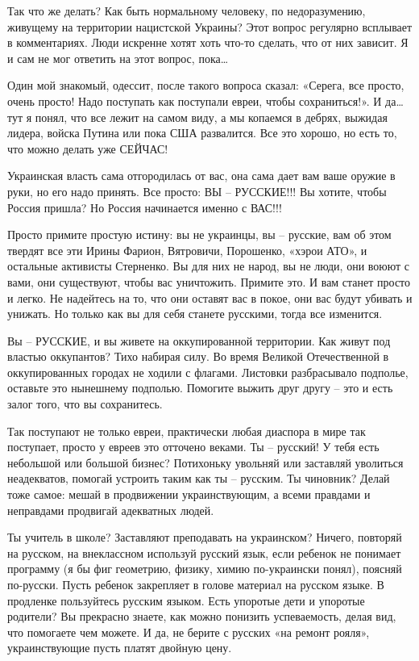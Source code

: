 Так что же делать? Как быть нормальному человеку, по недоразумению, живущему на
территории нацистской Украины? Этот вопрос регулярно всплывает в комментариях.
Люди искренне хотят хоть что-то сделать, что от них зависит. Я и сам не мог
ответить на этот вопрос, пока…

Один мой знакомый, одессит, после такого вопроса сказал: «Серега, все просто,
очень просто! Надо поступать как поступали евреи, чтобы сохраниться!». И да…
тут я понял, что все лежит на самом виду, а мы копаемся в дебрях, выжидая
лидера, войска Путина или пока США развалится. Все это хорошо, но есть то, что
можно делать уже СЕЙЧАС!

Украинская власть сама отгородилась от вас, она сама дает вам ваше оружие в
руки, но его надо принять. Все просто: ВЫ – РУССКИЕ!!! Вы хотите, чтобы Россия
пришла? Но Россия начинается именно с ВАС!!!

Просто примите простую истину: вы не украинцы, вы – русские, вам об этом
твердят все эти Ирины Фарион, Вятровичи, Порошенко, «хэрои АТО», и остальные
активисты Стерненко. Вы для них не народ, вы не люди, они воюют с вами, они
существуют, чтобы вас уничтожить. Примите это. И вам станет просто и легко. Не
надейтесь на то, что они оставят вас в покое, они вас будут убивать и унижать.
Но только как вы для себя станете русскими, тогда все изменится.

Вы – РУССКИЕ, и вы живете на оккупированной территории. Как живут под властью
оккупантов? Тихо набирая силу. Во время Великой Отечественной в оккупированных
городах не ходили с флагами. Листовки разбрасывало подполье, оставьте это
нынешнему подполью. Помогите выжить друг другу – это и есть залог того, что вы
сохранитесь.

Так поступают не только евреи, практически любая диаспора в мире так поступает,
просто у евреев это отточено веками. Ты – русский! У тебя есть небольшой или
большой бизнес? Потихоньку увольняй или заставляй уволиться неадекватов,
помогай устроить таким как ты – русским. Ты чиновник? Делай тоже самое: мешай в
продвижении украинствующим, а всеми правдами и неправдами продвигай адекватных
людей.

Ты учитель в школе? Заставляют преподавать на украинском? Ничего, повторяй на
русском, на внеклассном используй русский язык, если ребенок не понимает
программу (я бы фиг геометрию, физику, химию по-украински понял), поясняй
по-русски. Пусть ребенок закрепляет в голове материал на русском языке. В
продленке пользуйтесь русским языком. Есть упоротые дети и упоротые родители?
Вы прекрасно знаете, как можно понизить успеваемость, делая вид, что помогаете
чем можете. И да, не берите с русских «на ремонт рояля», украинствующие пусть
платят двойную цену.

